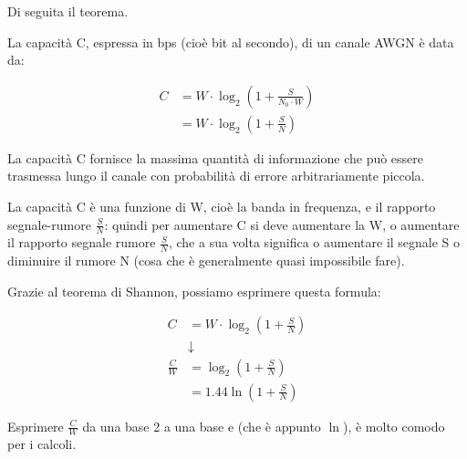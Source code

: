 Di seguita il teorema. \newline 

La capacità C, espressa in bps (cioè bit al secondo), 
di un canale AWGN è data da: 

{
    \Large 
    \begin{equation}
        \begin{split}
            C 
            &= 
            W 
            \cdot 
            \log_{2}
            \left(
                1 + \frac{S}{N_0 \cdot W}
            \right)
            \\
            &= 
            W 
            \cdot 
            \log_{2}
            \left(
                1 + \frac{S}{N}
            \right)
        \end{split} 
    \end{equation}
}

La capacità C fornisce la massima quantità di informazione che può essere trasmessa lungo il canale 
con probabilità di errore arbitrariamente piccola. \newline 

La capacità C è una funzione di W, cioè la banda in frequenza,  e il rapporto segnale-rumore $\frac{S}{N}$: 
quindi per aumentare C si deve aumentare la W, 
o aumentare il rapporto segnale rumore $\frac{S}{N}$, 
che a sua volta significa o aumentare il segnale S o diminuire il rumore N (cosa che è generalmente quasi impossibile fare). \newline

Grazie al teorema di Shannon, 
possiamo esprimere questa formula: 

{
    \Large 
    \begin{equation}
        \begin{split}
            C 
            &= 
            W 
            \cdot 
            \log_{2}
            \left(
                1 + \frac{S}{N}
            \right)
            \\
            &\downarrow
            \\
            \frac{C}{W}
            &=
            \log_{2}
            \left(
                1 + \frac{S}{N}
            \right)
            \\
            &= 
            1.44
            \ln
            \left(
                1 + \frac{S}{N}
            \right)
        \end{split}
    \end{equation}
}

Esprimere $\frac{C}{W}$ da una base 2 a una base e (che è appunto $\ln$), 
è molto comodo per i calcoli. \newline 

